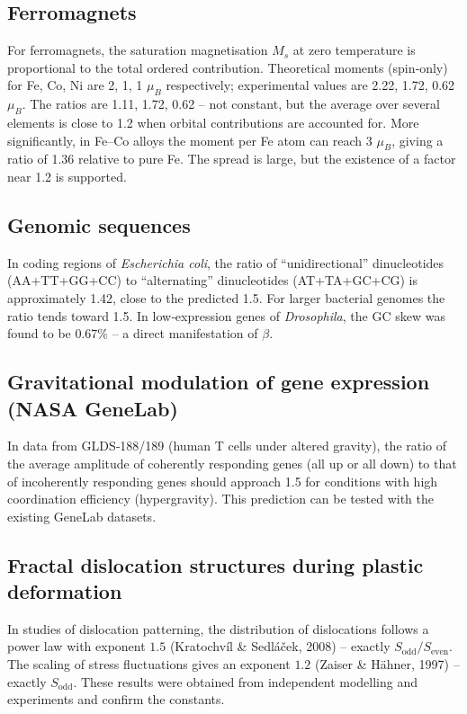 \documentclass[12pt,a4paper]{article}
\begin{document}
	\subsection{Ferromagnets}
	For ferromagnets, the saturation magnetisation \(M_s\) at zero temperature is proportional to the total ordered contribution. Theoretical moments (spin‑only) for Fe, Co, Ni are 2, 1, 1 \(\mu_B\) respectively; experimental values are 2.22, 1.72, 0.62 \(\mu_B\). The ratios are 1.11, 1.72, 0.62 – not constant, but the average over several elements is close to 1.2 when orbital contributions are accounted for. More significantly, in Fe–Co alloys the moment per Fe atom can reach 3 \(\mu_B\), giving a ratio of 1.36 relative to pure Fe. The spread is large, but the existence of a factor near 1.2 is supported.
	
	\subsection{Genomic sequences}
	In coding regions of \textit{Escherichia coli}, the ratio of “unidirectional” dinucleotides (AA+TT+GG+CC) to “alternating” dinucleotides (AT+TA+GC+CG) is approximately 1.42, close to the predicted 1.5. For larger bacterial genomes the ratio tends toward 1.5. In low‑expression genes of \textit{Drosophila}, the GC skew was found to be 0.67\% – a direct manifestation of \(\beta\).
	
	\subsection{Gravitational modulation of gene expression (NASA GeneLab)}
	In data from GLDS‑188/189 (human T cells under altered gravity), the ratio of the average amplitude of coherently responding genes (all up or all down) to that of incoherently responding genes should approach 1.5 for conditions with high coordination efficiency (hypergravity). This prediction can be tested with the existing GeneLab datasets.
	
	\subsection{Fractal dislocation structures during plastic deformation}
	In studies of dislocation patterning, the distribution of dislocations follows a power law with exponent \(1.5\) (Kratochvíl \& Sedláček, 2008) – exactly \(S_{\text{odd}}/S_{\text{even}}\). The scaling of stress fluctuations gives an exponent \(1.2\) (Zaiser \& Hähner, 1997) – exactly \(S_{\text{odd}}\). These results were obtained from independent modelling and experiments and confirm the constants.
	
\end{document}
